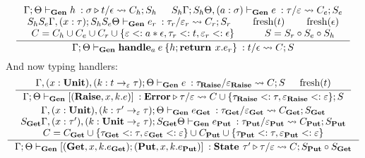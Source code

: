\documentclass[declaration,shortabstract]{iithesis}
\newcommand{\gens}[6][\Gamma;\Theta]{\ensuremath{{{#1} \vdash_\textbf{Gen} {#2} \: : {#3}/{#4}} \rightsquigarrow {#5};{#6}}}
\newcommand{\arrow}[3]{{#1}\rightarrow_{#2}{#3}}
\newcommand{\fresh}[1]{\ensuremath{\operatorname{fresh}({#1})}}
\begin{document}
\begin{gather*}
\begin{gathered}
\\
\inference{
\gens{h}{\sigma \triangleright t}{\epsilon}{C_h}{S_h} &
\gens[S_h\Gamma; S_h\Theta, (a:\sigma)]{e}{\tau}{\varepsilon}{C_e}{S_e} \\
\gens[S_h S_e \Gamma,(x:\tau); S_h S_e \Theta]{e_r}{\tau_r}{\varepsilon_r}{C_r}{S_r} & 
\fresh{t} & \fresh{\epsilon} \\
C = C_h \cup C_e \cup C_r \cup\{\varepsilon <: a * \epsilon, \tau_r <: t, \varepsilon_r <: \epsilon \} &
S = S_r \circ S_e \circ S_h
}{
\gens{\textbf{handle}_a \: e\: \{h;\textbf{return } x. e_r\}}{t}{\epsilon}{C}{S}
}
\end{gathered}
\end{gather*}
And now typing handlers:
\begin{gather*}
\begin{gathered}
\inference{ 
\gens[\Gamma,(x:\textbf{Unit}), (k:\arrow{t}{\varepsilon}{\tau});\Theta]{e}{\tau_\textbf{Raise}}{\varepsilon_\textbf{Raise}}{C}{S} &
\fresh{t}
}{
\gens{ [(\textbf{Raise}, x, k. e)]}{\textbf{Error}\triangleright \tau}{\varepsilon}{C\cup\{\tau_\textbf{Raise} <: \tau, \varepsilon_\textbf{Raise} <: \varepsilon\}}{S}
}
\\
\inference{
\gens[\Gamma,(x:\textbf{Unit}), (k:\arrow{\tau'}{\varepsilon}{\tau});\Theta] 
{e_\textbf{Get}}{\tau_\textbf{Get}}{\varepsilon_\textbf{Get}}{C_\textbf{Get}}{S_\textbf{Get}}
\\
\gens[S_\textbf{Get}\Gamma,(x:\tau'), (k:\arrow{\textbf{Unit}}{\varepsilon}{\tau});S_\textbf{Get} \Theta]
{e_\textbf{Put}}{\tau_\textbf{Put}}{\varepsilon_\textbf{Put}}{C_\textbf{Put}}{S_\textbf{Put}} \\
C = C_\textbf{Get} \cup \{ \tau_\textbf{Get} <: \tau,  \varepsilon_\textbf{Get} <: \varepsilon \}
\cup C_\textbf{Put} \cup \{ \tau_\textbf{Put} <: \tau,  \varepsilon_\textbf{Put} <: \varepsilon \}
}{
\gens{ [(\textbf{Get}, x, k. e_\textbf{Get});(\textbf{Put}, x, k. e_\textbf{Put})]}{\textbf{State }\tau'\triangleright \tau}{\varepsilon}{C}{S_\textbf{Put} \circ S_\textbf{Get}}
}
\end{gathered}
\end{gather*}
\setlength{\jot}{3pt}

\end{document}
